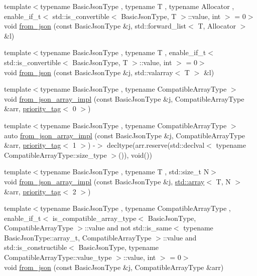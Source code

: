 \begin{DoxyCompactItemize}
\item 
{\footnotesize template$<$typename Basic\+Json\+Type , typename T , typename Allocator , enable\+\_\+if\+\_\+t$<$ std\+::is\+\_\+convertible$<$ Basic\+Json\+Type, T $>$\+::value, int $>$  = 0$>$ }\\void \hyperlink{namespacenlohmann_1_1detail_a5cfb765aad92795abd7fda29d017272a}{from\+\_\+json} (const Basic\+Json\+Type \&j, std\+::forward\+\_\+list$<$ T, Allocator $>$ \&l)
\item 
{\footnotesize template$<$typename Basic\+Json\+Type , typename T , enable\+\_\+if\+\_\+t$<$ std\+::is\+\_\+convertible$<$ Basic\+Json\+Type, T $>$\+::value, int $>$  = 0$>$ }\\void \hyperlink{namespacenlohmann_1_1detail_a3df497b1d3977f071b488ecac1401517}{from\+\_\+json} (const Basic\+Json\+Type \&j, std\+::valarray$<$ T $>$ \&l)
\item 
{\footnotesize template$<$typename Basic\+Json\+Type , typename Compatible\+Array\+Type $>$ }\\void \hyperlink{namespacenlohmann_1_1detail_ac53673a5ce29fb69b96d41dad33cb3b0}{from\+\_\+json\+\_\+array\+\_\+impl} (const Basic\+Json\+Type \&j, Compatible\+Array\+Type \&arr, \hyperlink{structnlohmann_1_1detail_1_1priority__tag}{priority\+\_\+tag}$<$ 0 $>$)
\item 
{\footnotesize template$<$typename Basic\+Json\+Type , typename Compatible\+Array\+Type $>$ }\\auto \hyperlink{namespacenlohmann_1_1detail_a57f93ed57254a1639087cdc316e0fb83}{from\+\_\+json\+\_\+array\+\_\+impl} (const Basic\+Json\+Type \&j, Compatible\+Array\+Type \&arr, \hyperlink{structnlohmann_1_1detail_1_1priority__tag}{priority\+\_\+tag}$<$ 1 $>$) -\/$>$ decltype(arr.\+reserve(std\+::declval$<$ typename Compatible\+Array\+Type\+::size\+\_\+type $>$()), void())
\item 
{\footnotesize template$<$typename Basic\+Json\+Type , typename T , std\+::size\+\_\+t N$>$ }\\void \hyperlink{namespacenlohmann_1_1detail_a46b0781205d0bdc5a959343b389966a4}{from\+\_\+json\+\_\+array\+\_\+impl} (const Basic\+Json\+Type \&j, \hyperlink{namespacenlohmann_1_1detail_a1ed8fc6239da25abcaf681d30ace4985af1f713c9e000f5d3f280adbd124df4f5}{std\+::array}$<$ T, N $>$ \&arr, \hyperlink{structnlohmann_1_1detail_1_1priority__tag}{priority\+\_\+tag}$<$ 2 $>$)
\item 
{\footnotesize template$<$typename Basic\+Json\+Type , typename Compatible\+Array\+Type , enable\+\_\+if\+\_\+t$<$ is\+\_\+compatible\+\_\+array\+\_\+type$<$ Basic\+Json\+Type, Compatible\+Array\+Type $>$\+::value and not std\+::is\+\_\+same$<$ typename Basic\+Json\+Type\+::array\+\_\+t, Compatible\+Array\+Type $>$\+::value and std\+::is\+\_\+constructible$<$ Basic\+Json\+Type, typename Compatible\+Array\+Type\+::value\+\_\+type $>$\+::value, int $>$  = 0$>$ }\\void \hyperlink{namespacenlohmann_1_1detail_a8dcac00852dbe1f61d1e78135b19d428}{from\+\_\+json} (const Basic\+Json\+Type \&j, Compatible\+Array\+Type \&arr)

\end{DoxyCompactItemize}
